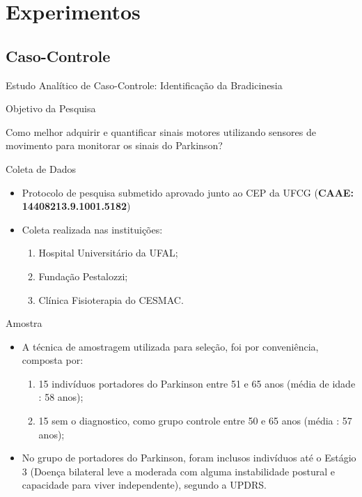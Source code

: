 \documentclass{beamer}
\begin{document}
\section{Experimentos}
\subsection{Caso-Controle}
\begin{frame}{Estudo Analítico de Caso-Controle: Identificação da Bradicinesia} 
    \begin{block}{Objetivo da Pesquisa}

    
    Como melhor adquirir e quantificar sinais motores utilizando sensores de movimento para monitorar os sinais do Parkinson?

    \end{block}
		\begin{block}{Coleta de Dados}
			\begin{itemize}
				\item Protocolo de pesquisa submetido aprovado junto ao CEP da UFCG (\textbf{CAAE: 14408213.9.1001.5182})
				\item Coleta realizada nas instituições:
					\begin{enumerate}
						\item Hospital Universitário da UFAL;
						\item Fundação Pestalozzi;
						\item Clínica Fisioterapia do CESMAC.
				\end{enumerate}				
			\end{itemize}
    \end{block}
\end{frame}

\begin{frame}{Amostra} 
    \begin{block}{}
			\begin{itemize}
				\item A técnica de amostragem utilizada para seleção, foi por conveniência, composta por:
				\begin{enumerate}
					\item 15 indivíduos portadores do Parkinson entre 51 e 65 anos (média de idade : 58 anos);
					\item 15 sem o diagnostico, como grupo controle entre 50 e 65 anos (média : 57 anos);
				\end{enumerate}
					\item No grupo de portadores do Parkinson, foram inclusos indivíduos até o Estágio 3 (Doença bilateral leve a moderada com alguma instabilidade postural e capacidade para viver independente), segundo a UPDRS.
				\end{itemize}
    \end{block}
\end{frame}
 
\end{document}
